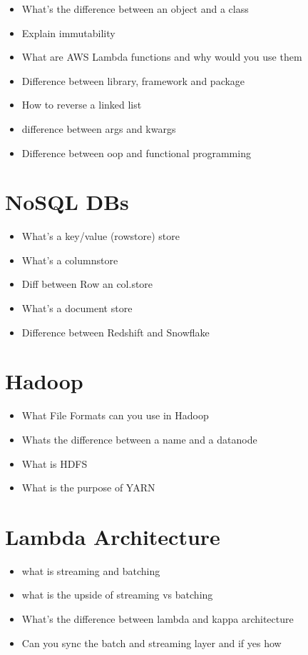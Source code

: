 \documentclass[12pt, numbers=noenddot]{scrreprt} %
\begin{document}
\begin{itemize}
\item What's the difference between an object and a class
\item Explain immutability
\item What are AWS Lambda functions and why would you use them
\item Difference between library, framework and package
\item How to reverse a linked list
\item difference between args and kwargs
\item Difference between oop and functional programming
\end{itemize}

\section*{NoSQL DBs}

\begin{itemize}
\item What's a key/value (rowstore) store
\item What's a columnstore
\item Diff between Row an col.store
\item What's a document store
\item Difference between Redshift and Snowflake
\end{itemize}

\section*{Hadoop}

\begin{itemize}
\item What File Formats can you use in Hadoop
\item Whats the difference between a name and a datanode
\item What is HDFS
\item What is the purpose of YARN
\end{itemize}

\section*{Lambda Architecture}

\begin{itemize}
\item what is streaming and batching
\item what is the upside of streaming vs batching
\item What's the difference between lambda and kappa architecture
\item Can you sync the batch and streaming layer and if yes how
\end{itemize}
\end{document}
